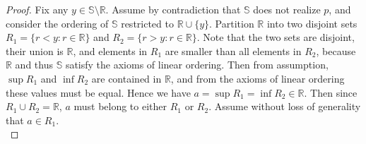 \documentclass{article}
\begin{document}
\begin{enumerate}[label={\bf Q\arabic*:}]
\begin{proof}



      Fix any $y\in\mathbb{S}\setminus\mathbb{R}$. Assume by contradiction
      that $\mathbb{S}$ does not realize $p$, and consider the ordering of
      $\mathbb{S}$ restricted to $\mathbb{R}\cup\{y\}$. Partition
      $\mathbb{R}$ into two disjoint sets $R_1=\{r<y:r\in\mathbb{R}\}$ and
      $R_2=\{r>y:r\in\mathbb{R}\}$. Note that the two sets are disjoint,
      their union is $\mathbb{R}$, and elements in $R_1$ are smaller than
      all elements in $R_2$, because $\mathbb{R}$ and thus $\mathbb{S}$
      satisfy the axioms of linear ordering. Then from assumption,
      $\sup{R_1}$ and $\inf{R_2}$ are contained in $\mathbb{R}$, and from
      the axioms of linear ordering these values must be equal. Hence we
      have $a=\sup{R_1}=\inf{R_2}\in\mathbb{R}$. Then since $R_1\cup
      R_2=\mathbb{R}$, $a$ must belong to either $R_1$ or $R_2$. Assume
      without loss of generality that $a\in R_1$. \\


\end{proof}
\end{enumerate}
\end{document}
